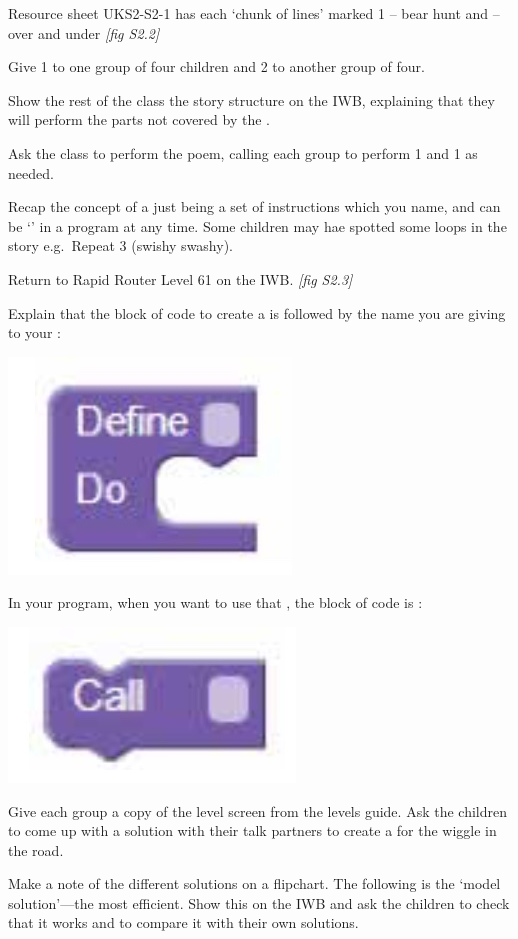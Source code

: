 \documentclass{../../../lessonplan}
\begin{document}
\begin{lessonplan}
Resource sheet UKS2-S2-1 has each `chunk of lines' marked  1 -- bear hunt and  -- over and under \textit{[fig S2.2]}



Give  1 to one group of four children and  2 to another group of four.

Show the rest of the class the story structure on the IWB, explaining that they will perform the parts not covered by the .

Ask the class to perform the poem, calling each group to perform  1 and  1 as needed.

Recap the concept of a  just being a set of instructions which you name, and can be `' in a program at any time.
Some children may hae spotted some  loops in the story e.g.\ Repeat 3 (swishy swashy).

Return to Rapid Router Level 61 on the IWB. \textit{[fig S2.3]}



Explain that the block of code to create a  is  followed by the name you are giving to your :

\includegraphics[width=.3\linewidth]{define.jpg}

In your program, when you want to use that , the block of code is :

\includegraphics[width=.3\linewidth]{call.jpg}

Give each group a copy of the level screen from the levels guide.
Ask the children to come up with a solution with their talk partners to create a  for the wiggle in the road.

Make a note of the different solutions on a flipchart.
The following is the `model solution'---the most efficient.
Show this on the IWB and ask the children to check that it works and to compare it with their own solutions.


\end{lessonplan}
\end{document}

